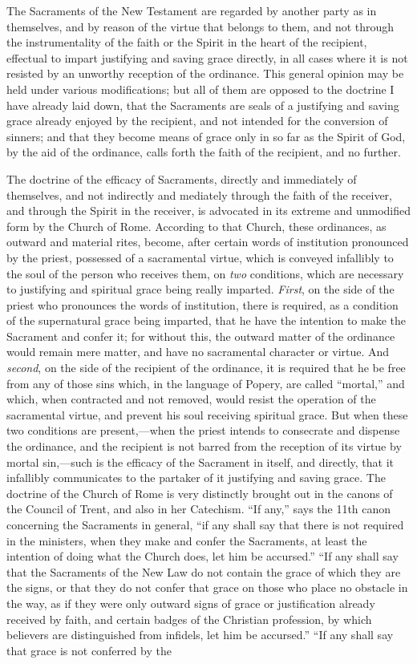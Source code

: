 \documentclass[]{book}
\begin{document}
The Sacraments of the New Testament are regarded by another party as in themselves, and by reason of the virtue that belongs to them, and not through the instrumentality of the faith or the Spirit in the heart of the recipient, effectual to impart justifying and saving grace directly, in all cases where it is not resisted by an unworthy reception of the ordinance. This general opinion may be held under various modifications; but all of them are opposed to the doctrine I have already laid down, that the Sacraments are seals of a justifying and saving grace already enjoyed by the recipient, and not intended for the conversion of sinners; and that they become means of grace only in so far as the Spirit of God, by the aid of the ordinance, calls forth the faith of the recipient, and no further.

The doctrine of the efficacy of Sacraments, directly and immediately of themselves, and not indirectly and mediately through the faith of the receiver, and through the Spirit in the receiver, is advocated in its extreme and unmodified form by the Church of Rome. According to that Church, these ordinances, as outward and material rites, become, after certain words of institution pronounced by the priest, possessed of a sacramental virtue, which is conveyed infallibly to the soul of the person who receives them, on \emph{two} conditions, which are necessary to justifying and spiritual grace being really imparted. \emph{First}, on the side of the priest who pronounces the words of institution, there is required, as a condition of the supernatural grace being imparted, that he have the intention to make the Sacrament and confer it; for without this, the outward matter of the ordinance would remain mere matter, and have no sacramental character or virtue. And \emph{second}, on the side of the recipient of the ordinance, it is required that he be free from any of those sins which, in the language of Popery, are called ``mortal,'' and which, when contracted and not removed, would resist the operation of the sacramental virtue, and prevent his soul receiving spiritual grace. But when these two conditions are present,---when the priest intends to consecrate and dispense the ordinance, and the recipient is not barred from the reception of its virtue by mortal sin,---such is the efficacy of the Sacrament in itself, and directly, that it infallibly communicates to the partaker of it justifying and saving grace. The doctrine of the Church of Rome is very distinctly brought out in the canons of the Council of Trent, and also in her Catechism. ``If any,'' says the 11th canon concerning the Sacraments in general, ``if any shall say that there is not required in the ministers, when they make and confer the Sacraments, at least the intention of doing what the Church does, let him be accursed.'' ``If any shall say that the Sacraments of the New Law do not contain the grace of which they are the signs, or that they do not confer that grace on those who place no obstacle in the way, as if they were only outward signs of grace or justification already received by faith, and certain badges of the Christian profession, by which believers are distinguished from infidels, let him be accursed.'' ``If any shall say that grace is not conferred by the 
\end{document}
